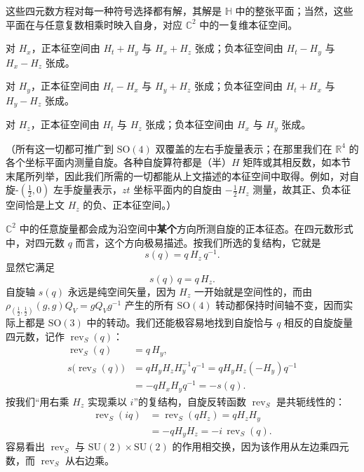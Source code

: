 这些四元数方程对每一种符号选择都有解，其解是 $\mathbb{H}$ 中的整张平面；当然，这些平面在与任意复数相乘时映入自身，对应 $\mathbb{C}^{2}$ 中的一复维本征空间。

对 $H_{x}$，正本征空间由 $H_{t}+H_{y}$ 与 $H_{x}+H_{z}$ 张成；负本征空间由 $H_{t}-H_{y}$ 与 $H_{x}-H_{z}$ 张成。

对 $H_{y}$，正本征空间由 $H_{t}-H_{x}$ 与 $H_{y}+H_{z}$ 张成；负本征空间由 $H_{t}+H_{x}$ 与 $H_{y}-H_{z}$ 张成。

对 $H_{z}$，正本征空间由 $H_{t}$ 与 $H_{z}$ 张成；负本征空间由 $H_{x}$ 与 $H_{y}$ 张成。

（所有这一切都可推广到 $\mathrm{SO}(4)$ 双覆盖的左右手旋量表示；在那里我们在 $\mathbb{R}^{4}$ 的各个坐标平面内测量自旋。各种自旋算符都是（半）$H$ 矩阵或其相反数，如本节末尾所列举，因此我们所需的一切都能从上文描述的本征空间中取得。例如，对自旋-$(\tfrac12,0)$ 左手旋量表示，$zt$ 坐标平面内的自旋由 $-\tfrac12 H_{z}$ 测量，故其正、负本征空间恰是上文 $H_{z}$ 的负、正本征空间。）

$\mathbb{C}^{2}$ 中的任意旋量都会成为沿空间中\textbf{某个}方向所测自旋的正本征态。在四元数形式中，对四元数 $q$ 而言，这个方向极易描述。按我们所选的复结构，它就是
\begin{equation}
s(q)=q\,H_{z}\,q^{-1}.
\end{equation}
显然它满足
\begin{equation}
s(q)\,q=q\,H_{z}.
\end{equation}
自旋轴 $s(q)$ 永远是纯空间矢量，因为 $H_{z}$ 一开始就是空间性的，而由 $\rho_{(\tfrac12,\tfrac12)}(g,g)Q_{V}=gQ_{V}g^{-1}$ 产生的所有 $\mathrm{SO}(4)$ 转动都保持时间轴不变，因而实际上都是 $\mathrm{SO}(3)$ 中的转动。我们还能极容易地找到自旋恰与 $q$ 相反的自旋旋量四元数，记作 $\operatorname{rev}_{S}(q)$：
\begin{align*}
\operatorname{rev}_{S}(q) &= q\,H_{y},\\
s\bigl(\operatorname{rev}_{S}(q)\bigr)
&= qH_{y}H_{z}H_{y}^{-1}q^{-1}
= qH_{y}H_{z}(-H_{y})q^{-1}\\
&= -qH_{x}H_{y}q^{-1}
= -s(q).
\end{align*}
按我们“用右乘 $H_{z}$ 实现乘以 $i$”的复结构，自旋反转函数 $\operatorname{rev}_{S}$ 是共轭线性的：
\begin{align*}
\operatorname{rev}_{S}(iq) &= \operatorname{rev}_{S}(qH_{z})=qH_{z}H_{y}\\
&= -qH_{y}H_{z}=-i\,\operatorname{rev}_{S}(q).
\end{align*}
容易看出 $\operatorname{rev}_{S}$ 与 $\mathrm{SU}(2)\times\mathrm{SU}(2)$ 的作用相交换，因为该作用从左边乘四元数，而 $\operatorname{rev}_{S}$ 从右边乘。

